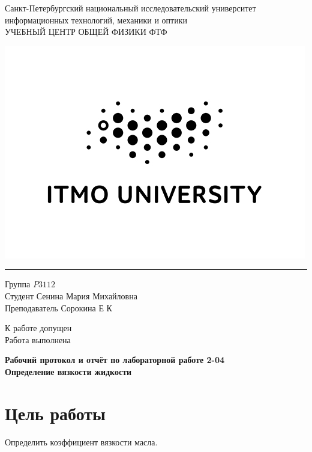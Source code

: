 \documentclass[a4paper]{article}
\begin{document}
\begin{minipage}{0.8\textwidth}
\begin{center}
    \large{Санкт-Петербургский национальный исследовательский университет информационных технологий, механики и оптики
\\УЧЕБНЫЙ ЦЕНТР ОБЩЕЙ ФИЗИКИ ФТФ}
\medbreak
\end{center}
\end{minipage}
\hfill
\begin{minipage}{0.3\textwidth}
\includegraphics[scale=0.4]{itmo.jpg}
\end{minipage}

\noindent\rule{\textwidth}{1pt}
\medbreak
\begin{minipage}{0.5\textwidth}
Группа $\textit{P3112}$						
\\Студент $\textit{Сенина Мария Михайловна}$			
\\Преподаватель $\textit{Сорокина Е К}$
\end{minipage}
\hfill
\begin{minipage}{0.4\textwidth}
К работе допущен
\\Работа выполнена
\end{minipage}

\bigbreak

\begin{center}
        \Large{\textbf{Рабочий протокол и отчёт по лабораторной работе 2-04}}
   \LARGE{\textbf{\\Определение вязкости жидкости}}
\end{center}

\section{Цель работы}
Определить коэффициент вязкости масла.
\end{document}
